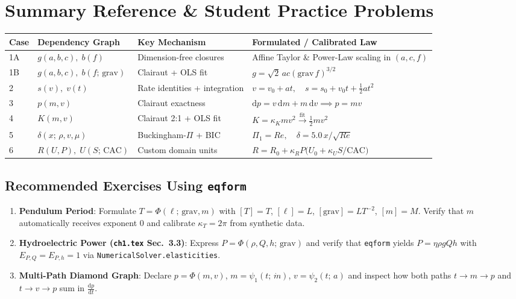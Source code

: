 \documentclass[11pt,a4paper]{article}
\newcommand{\dd}{\mathrm{d}}
\newcommand{\td}[2]{\frac{\dd #1}{\dd #2}}
\newcommand{\dimbr}[1]{\left[#1\right]}
\begin{document}
\section{Summary Reference \& Student Practice Problems}

\begin{center}
\renewcommand{\arraystretch}{1.25}
\footnotesize
\begin{tabularx}{\textwidth}{@{}l l l X@{}}
\toprule
\textbf{Case} & \textbf{Dependency Graph} & \textbf{Key Mechanism} & \textbf{Formulated / Calibrated Law} \\
\midrule
1A & $g(a,b,c),\; b(f)$ & Dimension-free closures & Affine Taylor \& Power-Law scaling in $(a,c,f)$ \\
1B & $g(a,b,c),\; b(f;\,\text{grav})$ & Clairaut + OLS fit & $g = \sqrt{2}\,a c (\text{grav}\,f)^{3/2}$ \\
2 & $s(v),\; v(t)$ & Rate identities + integration & $v = v_0 + at,\quad s = s_0 + v_0 t + \tfrac{1}{2}at^2$ \\
3 & $p(m,v)$ & Clairaut exactness & $\dd p = v\,\dd m + m\,\dd v \implies p = mv$ \\
4 & $K(m,v)$ & Clairaut 2:1 + OLS fit & $K = \kappa_K mv^2 \xrightarrow{\text{fit}} \tfrac{1}{2}mv^2$ \\
5 & $\delta(x;\,\rho,v,\mu)$ & Buckingham-$\Pi$ + BIC & $\Pi_1 = Re,\quad \delta = 5.0\,x/\sqrt{Re}$ \\
6 & $R(U,P),\; U(S;\,\text{CAC})$ & Custom domain units & $R = R_0 + \kappa_R P\bigl(U_0 + \kappa_U S/\text{CAC}\bigr)$ \\
\bottomrule
\end{tabularx}
\end{center}

\subsection*{Recommended Exercises Using \texttt{eqform}}
\begin{enumerate}[leftmargin=1.5em,itemsep=4pt]
  \item \textbf{Pendulum Period}: Formulate $T = \Phi(\ell;\, \text{grav}, m)$ with $\dimbr{T}=T$, $\dimbr{\ell}=L$, $\dimbr{\text{grav}}=LT^{-2}$, $\dimbr{m}=M$. Verify that $m$ automatically receives exponent $0$ and calibrate $\kappa_T = 2\pi$ from synthetic data.
  \item \textbf{Hydroelectric Power (\texttt{ch1.tex} Sec.~3.3)}: Express $P = \Phi(\rho, Q, h;\, \text{grav})$ and verify that \texttt{eqform} yields $P = \eta \rho g Q h$ with $E_{P,Q} = E_{P,h} = 1$ via \texttt{NumericalSolver.elasticities}.
  \item \textbf{Multi-Path Diamond Graph}: Declare $p = \Phi(m, v)$, $m = \psi_1(t;\,\dot{m})$, $v = \psi_2(t;\,a)$ and inspect how both paths $t \to m \to p$ and $t \to v \to p$ sum in $\td{p}{t}$.
\end{enumerate}
\end{document}
